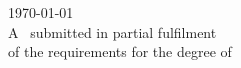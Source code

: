 \begin{titlepage}
{\large \today}\\[2cm] %

 
\vfill
 A \typeofthesis\ submitted in partial fulfilment\\of the requirements for the degree of\\
\degree

\vfill %

\end{titlepage}